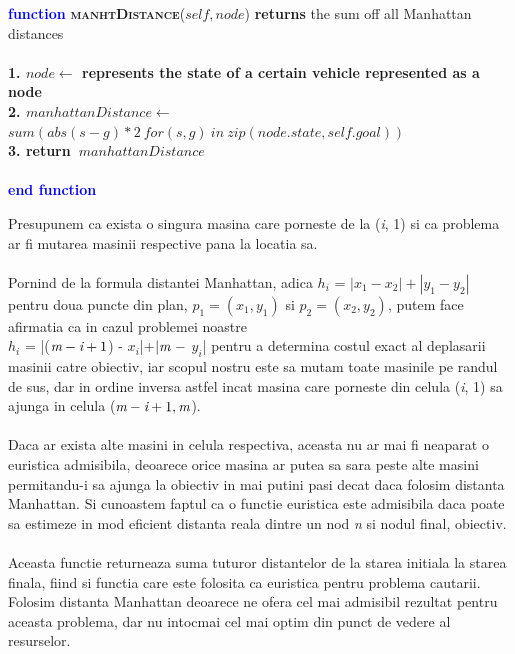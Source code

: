 \documentclass{article}
\begin{document}
\vspace{5mm}
\begin{center}
\begin{tabbing}
\large
\indent\textbf{\textcolor{blue}{func}}\=\textbf{\textcolor{blue}{tion}}
\textsc{\bfseries{manhtDistance}}{($self,node$)}\textbf{ returns} the sum off all Manhattan distances\\\\ 
\bfseries{1.}\indent \> $node \leftarrow $ represents the state of a certain vehicle represented as a node\\ 
\bfseries{2.}\indent \> $manhattanDistance \leftarrow$ $sum(abs(s-g)*2\ for(s,g) \ in \ zip(node.state,self.goal))$ \\
\bfseries{3.}\indent \> \textbf{return}\ $ manhattanDistance$\\\\
\indent\textbf{\textcolor{blue}{end }}\=\textbf{\textcolor{blue}{function}}
\end{tabbing}
\end{center}

\quad Presupunem ca exista o singura masina care porneste de la  (\emph i, 1) si ca problema ar fi mutarea masinii respective pana la locatia sa.\\\\
Pornind de la formula distantei Manhattan, adica \(h_i\) = \( |x_1-x_2|+|y_1-y_2|\) pentru doua puncte din plan, $p_1 = (x_1, y_1)$ si $p_2 = (x_2, y_2)$, putem face afirmatia ca in cazul problemei noastre \\ \(h_i\) = |(\(\emph m - \emph i + 1\)) - \(x_i\)|+\(|\emph m\ - \) \(y_i\)| pentru a determina costul exact al deplasarii masinii catre obiectiv, iar scopul nostru este sa mutam toate masinile pe randul de sus, dar in ordine inversa astfel incat masina care porneste din celula (\emph i, 1) sa ajunga
in celula (\(\emph m - \emph i + 1, \emph m \)).\\\\
Daca ar exista alte masini in celula respectiva, aceasta nu ar mai fi neaparat o euristica admisibila, deoarece orice masina ar putea sa sara peste alte masini permitandu-i sa ajunga la obiectiv in mai putini pasi decat daca folosim distanta Manhattan. Si cunoastem faptul ca o functie euristica este admisibila daca poate sa estimeze in mod eficient distanta reala dintre un nod \emph n si nodul final, obiectiv. \\\\ Aceasta functie returneaza suma tuturor distantelor de la starea initiala la starea finala, fiind si functia care este folosita ca euristica pentru problema cautarii. Folosim distanta Manhattan deoarece ne ofera cel mai admisibil rezultat pentru aceasta problema, dar nu intocmai cel mai optim din punct de vedere al resurselor.\\ \par
\vspace{6mm}
\end{document}
